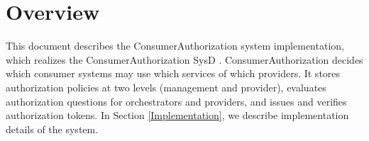 \documentclass[a4paper]{arrowhead}
\begin{document}
\sloppy

\ArrowheadSetup

\begin{center}
  \vspace*{1cm}
  \huge{\arrowtitle}

  \vspace*{0.2cm}
  \LARGE{\arrowtype}
  \vspace*{1cm}

  \vspace*{\fill}


  \vspace*{1cm}
  \vspace*{\fill}

  \begin{abstract}
    This document describes the design and implementation of the ConsumerAuthorization core system of Arrowhead 5.2.2 in Java Spring (\texttt{ah5-core-java-spring/consumer-authorization}).
  \end{abstract}

  \vspace*{1cm}
\end{center}

\newpage

\tableofcontents
\newpage

\section{Overview}
\label{sec:overview}

This document describes the ConsumerAuthorization system implementation, which realizes the ConsumerAuthorization SysD \cite{ca-sysd}. Consumer\allowbreak{}Authorization decides which consumer systems may use which services of which providers. It stores authorization policies at two levels (management and provider), evaluates authorization questions for orchestrators and providers, and issues and verifies authorization tokens.
In Section \ref{Implementation}, we describe implementation details of the system.
\end{document}
